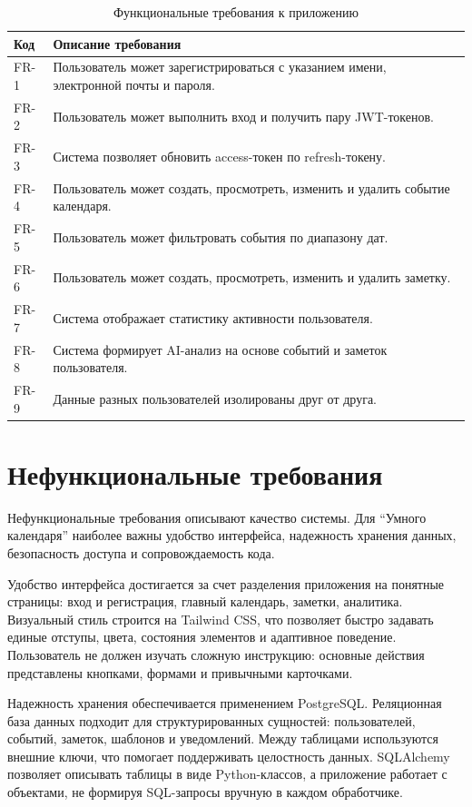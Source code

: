 \documentclass[14pt,a4paper]{extreport}
\begin{document}
\begin{longtable}{|p{}|p{}|}
\caption{Функциональные требования к приложению}\\
\hline
\textbf{Код} & \textbf{Описание требования}\\
\hline
FR-1 & Пользователь может зарегистрироваться с указанием имени, электронной почты и пароля.\\
\hline
FR-2 & Пользователь может выполнить вход и получить пару JWT-токенов.\\
\hline
FR-3 & Система позволяет обновить access-токен по refresh-токену.\\
\hline
FR-4 & Пользователь может создать, просмотреть, изменить и удалить событие календаря.\\
\hline
FR-5 & Пользователь может фильтровать события по диапазону дат.\\
\hline
FR-6 & Пользователь может создать, просмотреть, изменить и удалить заметку.\\
\hline
FR-7 & Система отображает статистику активности пользователя.\\
\hline
FR-8 & Система формирует AI-анализ на основе событий и заметок пользователя.\\
\hline
FR-9 & Данные разных пользователей изолированы друг от друга.\\
\hline
\end{longtable}

\section{Нефункциональные требования}

Нефункциональные требования описывают качество системы. Для ``Умного календаря'' наиболее важны удобство интерфейса, надежность хранения данных, безопасность доступа и сопровождаемость кода.

Удобство интерфейса достигается за счет разделения приложения на понятные страницы: вход и регистрация, главный календарь, заметки, аналитика. Визуальный стиль строится на Tailwind CSS, что позволяет быстро задавать единые отступы, цвета, состояния элементов и адаптивное поведение. Пользователь не должен изучать сложную инструкцию: основные действия представлены кнопками, формами и привычными карточками.

Надежность хранения обеспечивается применением PostgreSQL. Реляционная база данных подходит для структурированных сущностей: пользователей, событий, заметок, шаблонов и уведомлений. Между таблицами используются внешние ключи, что помогает поддерживать целостность данных. SQLAlchemy позволяет описывать таблицы в виде Python-классов, а приложение работает с объектами, не формируя SQL-запросы вручную в каждом обработчике.
\end{document}
